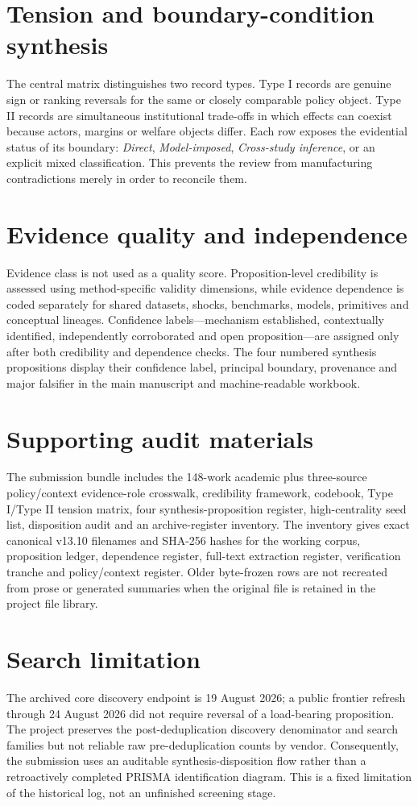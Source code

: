 \documentclass[10pt]{article}
\begin{document}
\section*{Tension and boundary-condition synthesis}
The central matrix distinguishes two record types. Type I records are genuine sign or ranking reversals for the same or closely comparable policy object. Type II records are simultaneous institutional trade-offs in which effects can coexist because actors, margins or welfare objects differ. Each row exposes the evidential status of its boundary: \emph{Direct}, \emph{Model-imposed}, \emph{Cross-study inference}, or an explicit mixed classification. This prevents the review from manufacturing contradictions merely in order to reconcile them.

\section*{Evidence quality and independence}
Evidence class is not used as a quality score. Proposition-level credibility is assessed using method-specific validity dimensions, while evidence dependence is coded separately for shared datasets, shocks, benchmarks, models, primitives and conceptual lineages. Confidence labels---mechanism established, contextually identified, independently corroborated and open proposition---are assigned only after both credibility and dependence checks. The four numbered synthesis propositions display their confidence label, principal boundary, provenance and major falsifier in the main manuscript and machine-readable workbook.

\section*{Supporting audit materials}
The submission bundle includes the 148-work academic plus three-source policy/context evidence-role crosswalk, credibility framework, codebook, Type I/Type II tension matrix, four synthesis-proposition register, high-centrality seed list, disposition audit and an archive-register inventory. The inventory gives exact canonical v13.10 filenames and SHA-256 hashes for the working corpus, proposition ledger, dependence register, full-text extraction register, verification tranche and policy/context register. Older byte-frozen rows are not recreated from prose or generated summaries when the original file is retained in the project file library.

\section*{Search limitation}
The archived core discovery endpoint is 19 August 2026; a public frontier refresh through 24 August 2026 did not require reversal of a load-bearing proposition. The project preserves the post-deduplication discovery denominator and search families but not reliable raw pre-deduplication counts by vendor. Consequently, the submission uses an auditable synthesis-disposition flow rather than a retroactively completed PRISMA identification diagram. This is a fixed limitation of the historical log, not an unfinished screening stage.
\end{document}
